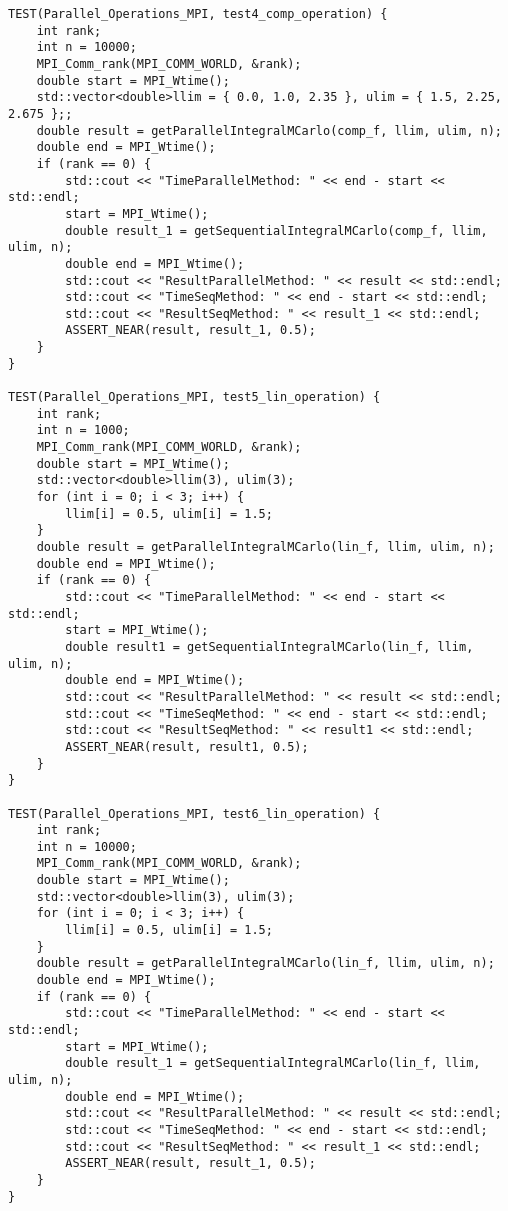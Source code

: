 \documentclass{report}
\begin{document}
\begin{lstlisting}
TEST(Parallel_Operations_MPI, test4_comp_operation) {
    int rank;
    int n = 10000;
    MPI_Comm_rank(MPI_COMM_WORLD, &rank);
    double start = MPI_Wtime();
    std::vector<double>llim = { 0.0, 1.0, 2.35 }, ulim = { 1.5, 2.25, 2.675 };;
    double result = getParallelIntegralMCarlo(comp_f, llim, ulim, n);
    double end = MPI_Wtime();
    if (rank == 0) {
        std::cout << "TimeParallelMethod: " << end - start << std::endl;
        start = MPI_Wtime();
        double result_1 = getSequentialIntegralMCarlo(comp_f, llim, ulim, n);
        double end = MPI_Wtime();
        std::cout << "ResultParallelMethod: " << result << std::endl;
        std::cout << "TimeSeqMethod: " << end - start << std::endl;
        std::cout << "ResultSeqMethod: " << result_1 << std::endl;
        ASSERT_NEAR(result, result_1, 0.5);
    }
}

TEST(Parallel_Operations_MPI, test5_lin_operation) {
    int rank;
    int n = 1000;
    MPI_Comm_rank(MPI_COMM_WORLD, &rank);
    double start = MPI_Wtime();
    std::vector<double>llim(3), ulim(3);
    for (int i = 0; i < 3; i++) {
        llim[i] = 0.5, ulim[i] = 1.5;
    }
    double result = getParallelIntegralMCarlo(lin_f, llim, ulim, n);
    double end = MPI_Wtime();
    if (rank == 0) {
        std::cout << "TimeParallelMethod: " << end - start << std::endl;
        start = MPI_Wtime();
        double result1 = getSequentialIntegralMCarlo(lin_f, llim, ulim, n);
        double end = MPI_Wtime();
        std::cout << "ResultParallelMethod: " << result << std::endl;
        std::cout << "TimeSeqMethod: " << end - start << std::endl;
        std::cout << "ResultSeqMethod: " << result1 << std::endl;
        ASSERT_NEAR(result, result1, 0.5);
    }
}

TEST(Parallel_Operations_MPI, test6_lin_operation) {
    int rank;
    int n = 10000;
    MPI_Comm_rank(MPI_COMM_WORLD, &rank);
    double start = MPI_Wtime();
    std::vector<double>llim(3), ulim(3);
    for (int i = 0; i < 3; i++) {
        llim[i] = 0.5, ulim[i] = 1.5;
    }
    double result = getParallelIntegralMCarlo(lin_f, llim, ulim, n);
    double end = MPI_Wtime();
    if (rank == 0) {
        std::cout << "TimeParallelMethod: " << end - start << std::endl;
        start = MPI_Wtime();
        double result_1 = getSequentialIntegralMCarlo(lin_f, llim, ulim, n);
        double end = MPI_Wtime();
        std::cout << "ResultParallelMethod: " << result << std::endl;
        std::cout << "TimeSeqMethod: " << end - start << std::endl;
        std::cout << "ResultSeqMethod: " << result_1 << std::endl;
        ASSERT_NEAR(result, result_1, 0.5);
    }
}


\end{lstlisting}
\end{document}
